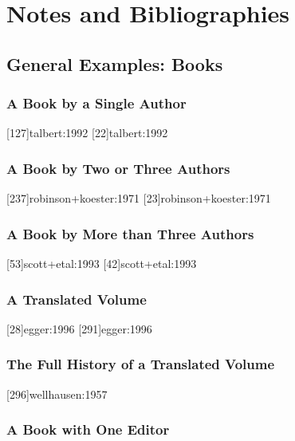 \documentclass[a4paper]{article}
\begin{document}
\setcounter{section}{5}

\section{Notes and Bibliographies}

\setcounter{subsection}{1}
\subsection{General Examples: Books}

\subsubsection{A Book by a Single Author}

[127]{talbert:1992}
[22]{talbert:1992}

\subsubsection{A Book by Two or Three Authors}

[237]{robinson+koester:1971}
[23]{robinson+koester:1971}

\subsubsection{A Book by More than Three Authors}

[53]{scott+etal:1993}
[42]{scott+etal:1993}

\subsubsection{A Translated Volume}

[28]{egger:1996}
[291]{egger:1996}

\subsubsection{The Full History of a Translated Volume}

[296]{wellhausen:1957}

\subsubsection{A Book with One Editor}
\end{document}
